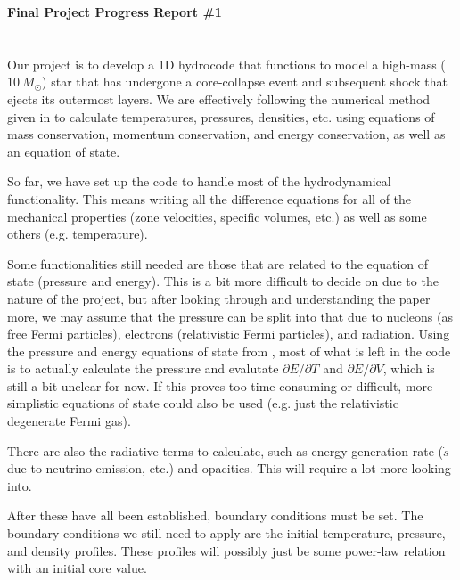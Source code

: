\documentclass[12pt]{article}
\begin{document}
\begin{center}\begin{LARGE}
\textbf{Final Project Progress Report \#1}
\end{LARGE}\end{center}


\section*{}

Our project is to develop a 1D hydrocode that functions to model a high-mass
($10\ M_\odot$) star that has undergone a core-collapse event and subsequent
shock that ejects its outermost layers. We are effectively following the
numerical method given in \citet{arnett66} to calculate temperatures,
pressures, densities, etc. using equations of mass conservation, momentum
conservation, and energy conservation, as well as an equation of state.

So far, we have set up the code to handle most of the hydrodynamical
functionality. This means writing all the difference equations for all of the
mechanical properties (zone velocities, specific volumes, etc.) as well as some
others (e.g. temperature).

Some functionalities still needed are those that are related to the
equation of state (pressure and energy). This is a bit more difficult to decide
on due to the nature of the project, but after looking through and
understanding the paper more, we may assume that the pressure can be split into
that due to nucleons (as free Fermi particles), electrons (relativistic Fermi
particles), and radiation. Using the pressure and energy equations of state
from \citet{arnett66}, most of what is left in the code is to actually
calculate the pressure and evalutate $\partial E / \partial T$ and
$\partial E / \partial V$, which is still a bit unclear for now. If this proves
too time-consuming or difficult, more simplistic equations of state could also
be used (e.g. just the relativistic degenerate Fermi gas).

There are also the radiative terms to calculate, such as energy generation
rate ($\dot{s}$ due to neutrino emission, etc.) and opacities. This will
require a lot more looking into.

After these have all been established, boundary conditions must be set. The
boundary conditions we still need to apply are the initial temperature,
pressure, and density profiles. These profiles will possibly just be some
power-law relation with an initial core value.
\end{document}
